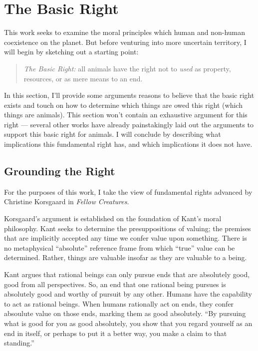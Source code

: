 \documentclass[12pt]{article}
\begin{document}
\section{The Basic Right}
	This work seeks to examine the moral principles which human and non-human
	coexistence on the planet.  But before venturing into more uncertain
	territory, I will begin by sketching out a starting point:

	\begin{quote}
		\emph{The Basic Right:} all animals have the right not to \emph{used}
	as property, resources, or as mere means to an end.  \end{quote}

	In this section, I’ll provide some arguments reasons to believe that the
	basic right exists and touch on how to determine which things are owed this
	right (which things are animals).  This section won’t contain an exhaustive
	argument for this right --- several other works have already painstakingly
	laid out the arguments to support this basic right for animals.  I will
	conclude by describing what implications this fundamental right has, and
	which implications it does not have.

	\subsection{Grounding the Right}
		
	For the purposes of this work, I take the view of fundamental rights
	advanced by Christine Korsgaard in \emph{Fellow Creatures}.\autocite{kors}

	Korsgaard’s argument is established on the foundation of Kant’s moral
	philosophy.  Kant seeks to determine the presuppositions of valuing; the
	premises that are implicitly accepted any time we confer value upon
	something.  There is no metaphysical “absolute” reference frame from which
	“true” value can be determined.  Rather, things are valuable insofar as
	they are valuable to a being.

	Kant argues that rational beings can only pursue ends that are absolutely
	good, good from all perspectives.\autocite[8.4.1]{kors} So, an end that one
	rational being pursues is absolutely good and worthy of pursuit by any
	other.  Humans have the capability to act as rational beings.  When humans
	rationally act on ends, they confer absoulute value on those ends, marking
	them as good absolutely.  “By pursuing what is good for you as good
	absolutely, you show that you regard yourself as an end in itself, or
	perhaps to put it a better way, you make a claim to that
	standing.”\autocite[8.4.4]{kors}
\end{document}
